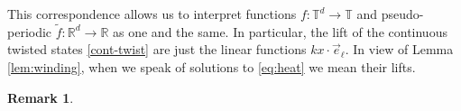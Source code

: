 \documentclass[a4paper,11pt]{amsart}
\newtheorem{remark}[theorem]{Remark}
\newcommand{\red}[1]{{#1}}
\newcommand{\R}{\mathbb{R}}
\newcommand{\T}{\mathbb{T}}
\newcommand{\Z}{\mathbb{Z}}
\newcommand{\purple}[1]{{\color{purple}#1}}{}
\numberwithin{equation}{section}
\numberwithin{theorem}{section}
\theoremstyle{definition}
\begin{document}
{This correspondence allows us to interpret functions $f:\mathbb{T}^d \to \mathbb{T}$ and pseudo-periodic $\tilde f:\mathbb{R}^d \to \mathbb{R}$ as one and the same. In particular, the lift of the continuous twisted states \eqref{cont-twist} are just the linear functions $kx\cdot \vec e_\ell$. In view of Lemma \ref{lem:winding}, when we speak of solutions to \eqref{eq:heat} we mean their lifts. }



\begin{remark}\label{rmk:extension}



\end{remark}
\end{document}
